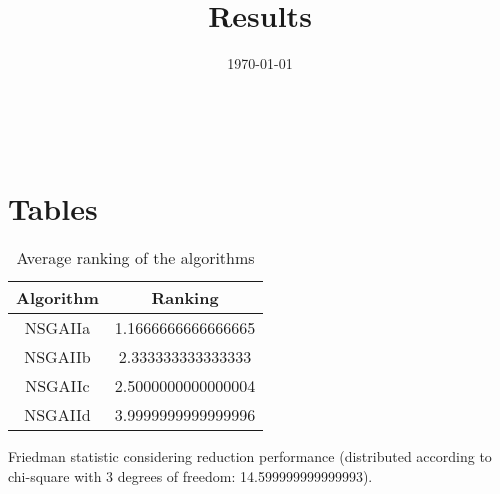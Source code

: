 \documentclass{article}
\title{Results}
\author{}
\date{\today}
\begin{document}
\oddsidemargin 0in \topmargin 0in\maketitle
\
\section{Tables}
\begin{table}[!htp]
\centering
\caption{Average ranking of the algorithms}
\begin{tabular}{c|c}
Algorithm&Ranking\\
\hline
NSGAIIa&1.1666666666666665\\
NSGAIIb&2.333333333333333\\
NSGAIIc&2.5000000000000004\\
NSGAIId&3.9999999999999996\\
\end{tabular}
\end{table}


Friedman statistic considering reduction performance (distributed according to chi-square with 3 degrees of freedom: 14.599999999999993).
\end{document}

